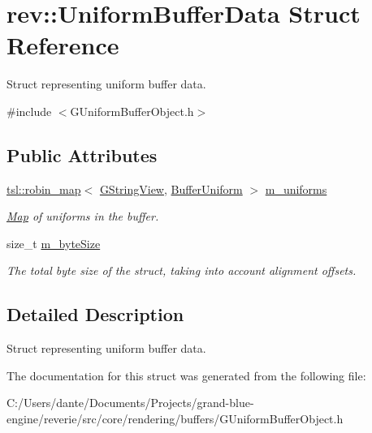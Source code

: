 \hypertarget{structrev_1_1_uniform_buffer_data}{}\section{rev\+::Uniform\+Buffer\+Data Struct Reference}
\label{structrev_1_1_uniform_buffer_data}


Struct representing uniform buffer data.  




{\ttfamily \#include $<$G\+Uniform\+Buffer\+Object.\+h$>$}

\subsection*{Public Attributes}
\begin{DoxyCompactItemize}
\item 
\mbox{\label{structrev_1_1_uniform_buffer_data_a7ada4cbab917c9134152879d4410a75b}} 
\mbox{\hyperlink{classtsl_1_1robin__map}{tsl\+::robin\+\_\+map}}$<$ \mbox{\hyperlink{classrev_1_1_g_string_view}{G\+String\+View}}, \mbox{\hyperlink{structrev_1_1_buffer_uniform}{Buffer\+Uniform}} $>$ \mbox{\hyperlink{structrev_1_1_uniform_buffer_data_a7ada4cbab917c9134152879d4410a75b}{m\+\_\+uniforms}}
\begin{DoxyCompactList}\small\item\em \mbox{\hyperlink{classrev_1_1_map}{Map}} of uniforms in the buffer. \end{DoxyCompactList}\item 
\mbox{\label{structrev_1_1_uniform_buffer_data_ab6c154a5b4c3a909e3b3de93c3fbd424}} 
size\+\_\+t \mbox{\hyperlink{structrev_1_1_uniform_buffer_data_ab6c154a5b4c3a909e3b3de93c3fbd424}{m\+\_\+byte\+Size}}
\begin{DoxyCompactList}\small\item\em The total byte size of the struct, taking into account alignment offsets. \end{DoxyCompactList}\end{DoxyCompactItemize}


\subsection{Detailed Description}
Struct representing uniform buffer data. 

The documentation for this struct was generated from the following file\+:\begin{DoxyCompactItemize}
\item 
C\+:/\+Users/dante/\+Documents/\+Projects/grand-\/blue-\/engine/reverie/src/core/rendering/buffers/G\+Uniform\+Buffer\+Object.\+h\end{DoxyCompactItemize}
